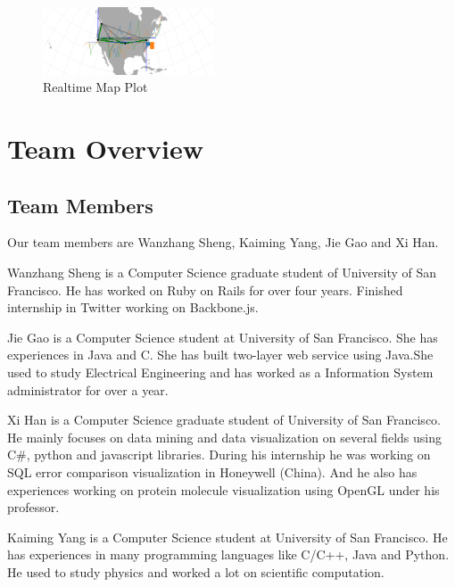 \documentclass[paper=a4, fontsize=11pt]{report} %
\begin{document}
\begin{description}[style=nextline]
    \begin{figure}[H]
        \begin{center}
            \includegraphics[width=0.45\textwidth]{realtime.png}
        \end{center}
        \caption{Realtime Map Plot}\label{fig:mapplot1}
    \end{figure}

\end{description}




\section{Team Overview} %
\label{sec:team_ovierview}

\subsection{Team Members} %
\label{sub:team_members}
Our team members are Wanzhang Sheng, Kaiming Yang, Jie Gao and Xi Han.

Wanzhang Sheng is a Computer Science graduate student of University of San Francisco. He has worked on Ruby on Rails for over four years. Finished internship in Twitter working on Backbone.js.

Jie Gao is a Computer Science student at University of San Francisco. She has experiences in Java and C. She has built two-layer web service using Java.She used to study Electrical Engineering and has worked as a Information System administrator for over a year.

Xi Han is a Computer Science graduate student of University of San Francisco. He mainly focuses on data mining and data visualization on several fields using C\#, python and javascript libraries. During his internship he was working on SQL error comparison visualization in Honeywell (China). And he also has experiences working on protein molecule visualization using OpenGL under his professor.

Kaiming Yang is a Computer Science student at University of San Francisco. He has experiences in many programming languages like C/C++, Java and Python. He used to study physics and worked a lot on scientific computation.
\end{document}
